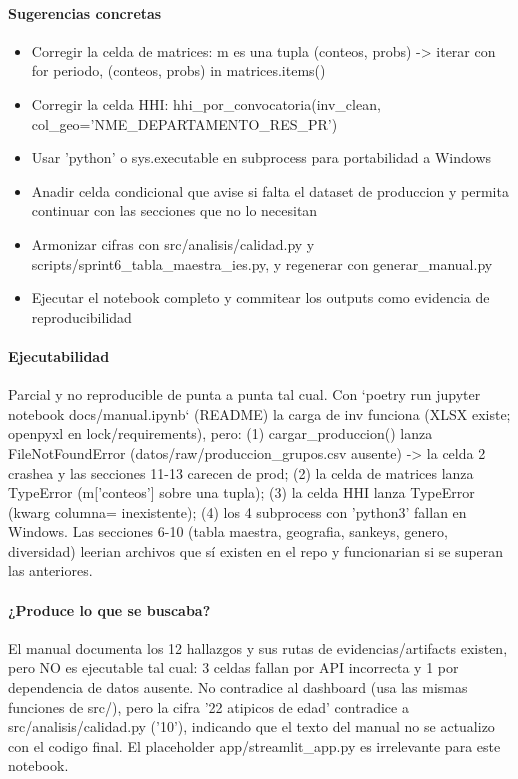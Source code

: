 \paragraph{Sugerencias concretas}
\begin{itemize}
  \item Corregir la celda de matrices: m es una tupla (conteos, probs) -> iterar con for periodo, (conteos, probs) in matrices.items()
  \item Corregir la celda HHI: hhi\_por\_convocatoria(inv\_clean, col\_geo='NME\_DEPARTAMENTO\_RES\_PR')
  \item Usar 'python' o sys.executable en subprocess para portabilidad a Windows
  \item Anadir celda condicional que avise si falta el dataset de produccion y permita continuar con las secciones que no lo necesitan
  \item Armonizar cifras con src/analisis/calidad.py y scripts/sprint6\_tabla\_maestra\_ies.py, y regenerar con generar\_manual.py
  \item Ejecutar el notebook completo y commitear los outputs como evidencia de reproducibilidad
\end{itemize}

\paragraph{Ejecutabilidad}
Parcial y no reproducible de punta a punta tal cual. Con `poetry run jupyter notebook docs/manual.ipynb` (README) la carga de inv funciona (XLSX existe; openpyxl en lock/requirements), pero: (1) cargar\_produccion() lanza FileNotFoundError (datos/raw/produccion\_grupos.csv ausente) -> la celda 2 crashea y las secciones 11-13 carecen de prod; (2) la celda de matrices lanza TypeError (m['conteos'] sobre una tupla); (3) la celda HHI lanza TypeError (kwarg columna= inexistente); (4) los 4 subprocess con 'python3' fallan en Windows. Las secciones 6-10 (tabla maestra, geografia, sankeys, genero, diversidad) leerian archivos que sí existen en el repo y funcionarian si se superan las anteriores.

\paragraph{¿Produce lo que se buscaba?}
El manual documenta los 12 hallazgos y sus rutas de evidencias/artifacts existen, pero NO es ejecutable tal cual: 3 celdas fallan por API incorrecta y 1 por dependencia de datos ausente. No contradice al dashboard (usa las mismas funciones de src/), pero la cifra '22 atipicos de edad' contradice a src/analisis/calidad.py ('10'), indicando que el texto del manual no se actualizo con el codigo final. El placeholder app/streamlit\_app.py es irrelevante para este notebook.


